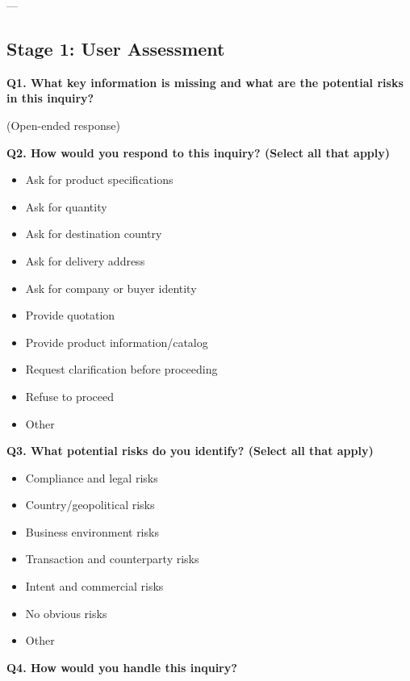 \documentclass[12pt,a4paper]{report}
\begin{document}
---

\subsection{Stage 1: User Assessment}

\textbf{Q1. What key information is missing and what are the potential risks in this inquiry?}

(Open-ended response)

\vspace{0.3cm}

\textbf{Q2. How would you respond to this inquiry? (Select all that apply)}

\begin{itemize}
    \item Ask for product specifications
    \item Ask for quantity
    \item Ask for destination country
    \item Ask for delivery address
    \item Ask for company or buyer identity
    \item Provide quotation
    \item Provide product information/catalog
    \item Request clarification before proceeding
    \item Refuse to proceed
    \item Other
\end{itemize}

\vspace{0.3cm}

\textbf{Q3. What potential risks do you identify? (Select all that apply)}

\begin{itemize}
    \item Compliance and legal risks
    \item Country/geopolitical risks
    \item Business environment risks
    \item Transaction and counterparty risks
    \item Intent and commercial risks
    \item No obvious risks
    \item Other
\end{itemize}

\vspace{0.3cm}

\textbf{Q4. How would you handle this inquiry?}
\end{document}
